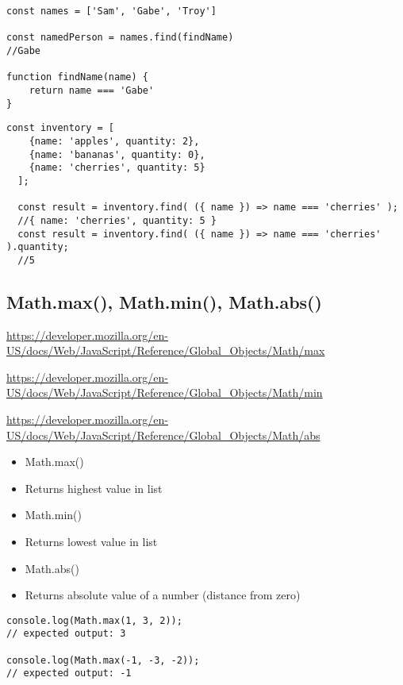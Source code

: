 \documentclass[10pt]{article}
\begin{document}
\begin{lstlisting}[title=Example find(), captionpos=t]
const names = ['Sam', 'Gabe', 'Troy']

const namedPerson = names.find(findName)
//Gabe

function findName(name) {
    return name === 'Gabe'
}
\end{lstlisting}

\begin{lstlisting}[title=Example find() with objects, captionpos=t]
const inventory = [
    {name: 'apples', quantity: 2},
    {name: 'bananas', quantity: 0},
    {name: 'cherries', quantity: 5}
  ];
  
  const result = inventory.find( ({ name }) => name === 'cherries' );
  //{ name: 'cherries', quantity: 5 }
  const result = inventory.find( ({ name }) => name === 'cherries' ).quantity;
  //5
\end{lstlisting}
\medskip %



\medskip %
\pagebreak
\subsection{Math.max(), Math.min(), Math.abs()}

\url{https://developer.mozilla.org/en-US/docs/Web/JavaScript/Reference/Global_Objects/Math/max}

\medskip

\url{https://developer.mozilla.org/en-US/docs/Web/JavaScript/Reference/Global_Objects/Math/min}

\medskip

\url{https://developer.mozilla.org/en-US/docs/Web/JavaScript/Reference/Global_Objects/Math/abs}


\begin{itemize}
	\item Math.max() 
	\item Returns highest value in list
	\item Math.min()
	\item Returns lowest value in list 
	\item Math.abs()
	\item Returns absolute value of a number (distance from zero) 
\end{itemize}

\begin{lstlisting}[title=Example Math.max(), captionpos=t]
console.log(Math.max(1, 3, 2));
// expected output: 3

console.log(Math.max(-1, -3, -2));
// expected output: -1
\end{lstlisting}
\end{document}
